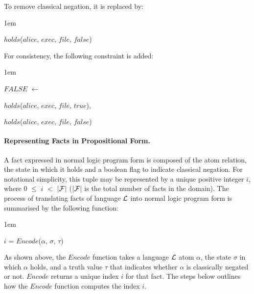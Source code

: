 \documentclass[global,twocolumn,final]{svjour}
\newenvironment{vquote}
  {\begin{list}{}{\leftmargin 1em}\item[]}
  {\end{list}}
\begin{document}
          \noindent
          To remove classical negation, it is replaced by:

          \begin{vquote}
            $holds$($alice$, $exec$, $file$, $false$)
          \end{vquote}

          \noindent
          For consistency, the following constraint is added:

          \begin{vquote}
            $FALSE$ $\leftarrow$

            \hspace{1em}
            $holds$($alice$, $exec$, $file$, $true$),

            \hspace{1em}
            $holds$($alice$, $exec$, $file$, $false$)
          \end{vquote}

        \paragraph{Representing Facts in Propositional Form.}

          A fact expressed in normal logic program form is composed of the
          atom relation, the state in which it holds and a boolean flag to
          indicate classical negation. For notational simplicity, this tuple
          may be represented by a unique positive integer $i$, where
          $0$ $\leq$ $i$ $<$ $|{\cal F}|$ ($|{\cal F}|$ is the total
          number of facts in the domain). The process of translating facts of
          language ${\cal L}$ into normal logic program form is summarised by
          the following function:

          \begin{vquote}
            $i$ = $Encode$($\alpha$, $\sigma$, $\tau$)
          \end{vquote}

          As shown above, the $Encode$ function takes a language ${\cal L}$
          atom $\alpha$, the state $\sigma$ in which $\alpha$ holds, and a
          truth value $\tau$ that indicates whether $\alpha$ is classically
          negated or not. $Encode$ returns a unique index $i$ for that
          fact. The steps below outlines how the $Encode$ function computes
          the index $i$.
\end{document}
